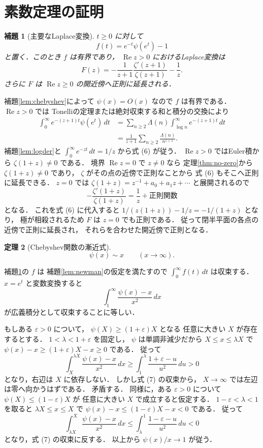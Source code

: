 \documentclass[a5paper,10pt,onecolumn]{jsarticle}
\makeatletter
\theoremstyle{mathnotetheorem}
\newtheorem{theorem}{定理}[section]
\newtheorem{lemma}[theorem]{補題}
\renewcommand{\proofname}{証明}
\renewenvironment{proof}[1][\proofname]{%
  \par\pushQED{\qed}\normalfont\topsep4\p@\@plus2\p@\relax
  \trivlist\item[\hskip\labelsep\bfseries #1]\ignorespaces
}{\popQED\endtrivlist\@endpefalse}
\makeatother
\begin{document}
\section{素数定理の証明}

\begin{lemma}[主要なLaplace変換]\label{lem:laplace}
$t\ge0$ に対して
\[
 f(t)=e^{-t}\psi(e^t)-1
\]
と置く．このとき $f$ は有界であり，
$\operatorname{Re}z>0$ におけるLaplace変換は
\[
 F(z)=-\frac1{z+1}
 \frac{\zeta'(z+1)}{\zeta(z+1)}-\frac1z.
 \tag{6}
\]
さらに $F$ は
$\operatorname{Re}z\ge0$ の開近傍へ正則に延長される．
\end{lemma}
\begin{proof}
補題\ref{lem:chebyshev}によって
$\psi(x)=O(x)$ なので $f$ は有界である．
$\operatorname{Re}z>0$ では
Tonelliの定理または絶対収束する和と積分の交換により
\[
 \begin{aligned}
 \int_0^\infty e^{-(z+1)t}\psi(e^t)\,dt
 &=\sum_{n\ge2}\Lambda(n)
   \int_{\log n}^\infty e^{-(z+1)t}\,dt\\
 &=\frac1{z+1}\sum_{n\ge2}
 \frac{\Lambda(n)}{n^{z+1}}.
 \end{aligned}
\]
補題\ref{lem:logder}と
$\int_0^\infty e^{-zt}\,dt=1/z$ から式 (6) が従う．
$\operatorname{Re}z>0$ ではEuler積から
$\zeta(1+z)\ne0$ である．
境界 $\operatorname{Re}z=0$ で $z\ne0$ なら
定理\ref{thm:no-zero}から
$\zeta(1+z)\ne0$ であり，
$\zeta$ がその点の近傍で正則なことから
式 (6) もそこへ正則に延長できる．
$z=0$ では
$\zeta(1+z)=z^{-1}+a_0+a_1z+\cdots$ と展開されるので
\[
 -\frac{\zeta'(1+z)}{\zeta(1+z)}
 =\frac1z+\text{正則関数}
\]
となる．
これを式 (6) に代入すると
$1/(z(1+z))-1/z=-1/(1+z)$ となり，
極が相殺されるため $F$ は $z=0$ でも正則である．
従って閉半平面の各点の近傍で正則に延長され，
それらを合わせた開近傍で正則となる．
\end{proof}

\begin{theorem}[Chebyshev関数の漸近式]\label{thm:psi}
\[
 \psi(x)\sim x\qquad(x\to\infty).
\]
\end{theorem}
\begin{proof}
補題\ref{lem:laplace}の $f$ は
補題\ref{lem:newman}の仮定を満たすので
$\int_0^\infty f(t)\,dt$ は収束する．
$x=e^t$ と変数変換すると
\[
 \int_1^\infty\frac{\psi(x)-x}{x^2}\,dx
 \tag{7}
\]
が広義積分として収束することに等しい．

もしある $\varepsilon>0$ について，
$\psi(X)\ge(1+\varepsilon)X$ となる
任意に大きい $X$ が存在するとする．
$1<\lambda<1+\varepsilon$ を固定し，
$\psi$ は単調非減少だから
$X\le x\le\lambda X$ で
$\psi(x)-x\ge(1+\varepsilon)X-x\ge0$ である．
従って
\[
 \int_X^{\lambda X}\frac{\psi(x)-x}{x^2}\,dx
 \ge\int_1^\lambda\frac{1+\varepsilon-u}{u^2}\,du>0
\]
となり，右辺は $X$ に依存しない．
しかし式 (7) の収束から，
$X\to\infty$ では左辺は零へ向かうはずである．
矛盾する．
同様に，ある $\varepsilon>0$ について
$\psi(X)\le(1-\varepsilon)X$ が
任意に大きい $X$ で成立すると仮定する．
$1-\varepsilon<\lambda<1$ を取ると
$\lambda X\le x\le X$ で
$\psi(x)-x\le(1-\varepsilon)X-x<0$ である．
従って
\[
 \int_{\lambda X}^{X}
 \frac{\psi(x)-x}{x^2}\,dx
 \le\int_\lambda^1
 \frac{1-\varepsilon-u}{u^2}\,du<0
\]
となり，式 (7) の収束に反する．
以上から $\psi(x)/x\to1$ が従う．
\end{proof}
\end{document}
